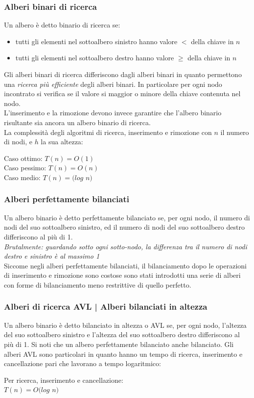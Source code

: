 \documentclass[11pt, oneside]{article}   	%
\begin{document}
\subsubsection{Alberi binari di ricerca}
Un albero è detto binario di ricerca se:
\begin{itemize}
\item tutti gli elementi nel sottoalbero sinistro hanno valore $<$ della chiave in $n$
\item tutti gli elementi nel sottoalbero destro hanno valore $\geq$ della chiave in $n$
\end{itemize}
Gli alberi binari di ricerca differiscono dagli alberi binari in quanto permettono una \emph{ricerca più efficiente} degli alberi binari. In particolare per ogni nodo incontrato si verifica se il valore si maggior o minore della chiave contenuta nel nodo. \\
L'inserimento e la rimozione devono invece garantire che l'albero binario risultante sia ancora un albero binario di ricerca.\\ La complessità degli algoritmi di ricerca, inserimento e rimozione con $n$ il numero di nodi, e $h$ la sua altezza:
\begin{center}
Caso ottimo: $T(n) = O(1)$\\
Caso pessimo: $T(n) = O(n)$\\
Caso medio: $T(n) = (log$ $n)$
\end{center}
\subsubsection{Alberi perfettamente bilanciati}
Un albero binario è detto perfettamente bilanciato se, per ogni nodo, il numero di nodi del suo sottoalbero sinistro, ed il numero di nodi del suo sottoalbero destro differiscono al più di 1.\\
\emph{Brutalmente: guardando sotto ogni sotto-nodo, la differenza tra il numero di nodi destro e sinistro è al massimo 1}\\
Siccome negli alberi perfettamente bilanciati, il bilanciamento dopo le operazioni di inserimento e rimozione sono costose sono stati introdotti una serie di alberi con forme di bilanciamento meno restrittive di quello perfetto.
\subsubsection{Alberi di ricerca AVL | Alberi bilanciati in altezza}
Un albero binario è detto bilanciato in altezza o AVL se, per ogni nodo, l'altezza del suo sottoalbero sinistro e l'altezza del suo sottoalbero destro differiscono al più di 1. Si noti che un albero perfettamente bilanciato anche bilanciato.
Gli alberi AVL sono particolari in quanto hanno un tempo di ricerca, inserimento e cancellazione pari che lavorano a tempo logaritmico:
\begin{center}
Per ricerca, inserimento e cancellazione:\\
$T(n) = O(log$ $n)$
\end{center}
\end{document}
